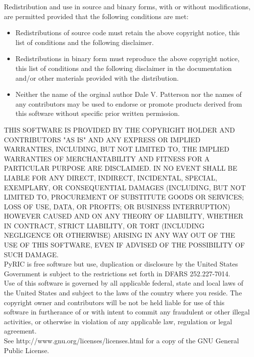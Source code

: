 \documentclass[11pt]{article}
\begin{document}
\begin{appendices}
Redistribution and use in source and binary forms, with or without modifications,
are permitted provided that the following conditions are met:
\begin{itemize}
\item Redistributions of source code must retain the above copyright notice, this
list of conditions and the following disclaimer.
\item Redistributions in binary form must reproduce the above copyright notice,
this list of conditions and the following disclaimer in the documentation and/or 
other materials provided with the distribution.
\item Neither the name of the orginal author Dale V. Patterson nor the names of 
any contributors may be used to endorse or promote products derived from this 
software without specific prior written permission.
\end{itemize}

THIS SOFTWARE IS PROVIDED BY THE COPYRIGHT HOLDER AND CONTRIBUTORS "AS IS" AND
ANY EXPRESS OR IMPLIED WARRANTIES, INCLUDING, BUT NOT LIMITED TO, THE IMPLIED
WARRANTIES OF MERCHANTABILITY AND FITNESS FOR A PARTICULAR PURPOSE ARE DISCLAIMED.
IN NO EVENT SHALL BE LIABLE FOR ANY DIRECT, INDIRECT, INCIDENTAL, SPECIAL,
EXEMPLARY, OR CONSEQUENTIAL DAMAGES (INCLUDING, BUT NOT LIMITED TO, PROCUREMENT
OF SUBSTITUTE GOODS OR SERVICES; LOSS OF USE, DATA, OR PROFITS; OR BUSINESS
INTERRUPTION) HOWEVER CAUSED AND ON ANY THEORY OF LIABILITY, WHETHER IN CONTRACT,
STRICT LIABILITY, OR TORT (INCLUDING NEGLIGENCE OR OTHERWISE) ARISING IN ANY WAY
OUT OF THE USE OF THIS SOFTWARE, EVEN IF ADVISED OF THE POSSIBILITY OF SUCH DAMAGE.\\

PyRIC is free software but use, duplication or disclosure by the United States
Government is subject to the restrictions set forth in DFARS 252.227-7014.\\

Use of this software is governed by all applicable federal, state and local
laws of the United States and subject to the laws of the country where you reside.
The copyright owner and contributors will be not be held liable for use of this
software in furtherance of or with intent to commit any fraudulent or other illegal
activities, or otherwise in violation of any applicable law, regulation or legal
agreement.\\

See http://www.gnu.org/licenses/licenses.html for a copy of the GNU General Public 
License.
\end{appendices}



\end{document}
